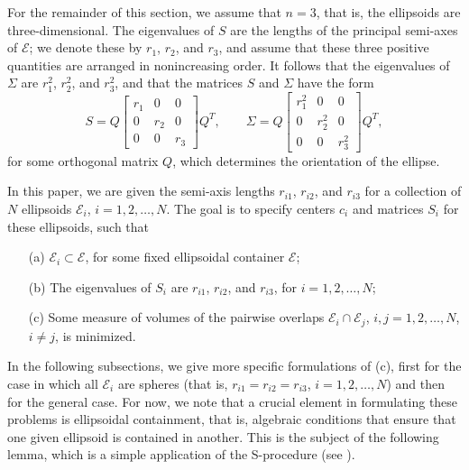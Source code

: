 \documentclass{siamltex}
\begin{document}
For the remainder of this section, we assume that $n=3$, that is, the
ellipsoids are three-dimensional. The eigenvalues of $S$ are the
lengths of the principal semi-axes of $\mathcal{E}$; we denote these
by $r_1$, $r_2$, and $r_3$, and assume that these three positive
quantities are arranged in nonincreasing order.  It follows that the
eigenvalues of $\Sigma$ are $r_1^2$, $r_2^2$, and $r_3^2$, and that
the matrices $S$ and $\Sigma$ have the form
\[
S = Q \left[ \begin{matrix} r_1 & 0 & 0 \\ 0 & r_2 & 0 \\ 0 & 0 & r_3 \end{matrix}
\right] Q^T, \qquad
\Sigma = Q \left[ \begin{matrix} r_1^2 & 0 & 0 \\ 0 & r_2^2 & 0 \\ 0 & 0 & r_3^2 \end{matrix}
\right] Q^T,
\]
for some orthogonal matrix $Q$, which determines the orientation of
the ellipse.

In this paper, we are given the semi-axis lengths $r_{i1}$, $r_{i2}$,
and $r_{i3}$ for a collection of $N$ ellipsoids $\mathcal{E}_i$,
$i=1,2,\dotsc,N$. The goal is to specify centers $c_i$ and matrices
$S_i$ for these ellipsoids, such that
\begin{itemize}
\item[(a)] $\mathcal{E}_i \subset \mathcal{E}$, for some fixed
  ellipsoidal container $\mathcal{E}$;
\item[(b)] The eigenvalues of $S_i$ are $r_{i1}$, $r_{i2}$, and
  $r_{i3}$, for $i=1,2,\dotsc,N$;
\item[(c)] Some measure of volumes of the pairwise overlaps
  $\mathcal{E}_i \cap \mathcal{E}_j$, $i,j=1,2,\dotsc,N$, $i \neq j$,
  is minimized.
\end{itemize}
In the following subsections, we give more specific formulations of (c),
first for the case in which all $\mathcal{E}_i$ are spheres (that is,
$r_{i1}=r_{i2}=r_{i3}$, $i=1,2,\dotsc,N$) and then for the general
case. For now, we note that a crucial element in formulating these
problems is ellipsoidal containment, that is, algebraic conditions
that ensure that one given ellipsoid is contained in another. This is
the subject of the following lemma, which is a simple application of
the S-procedure (see \cite[Appendix B.2]{BoyV03}).
\end{document}
